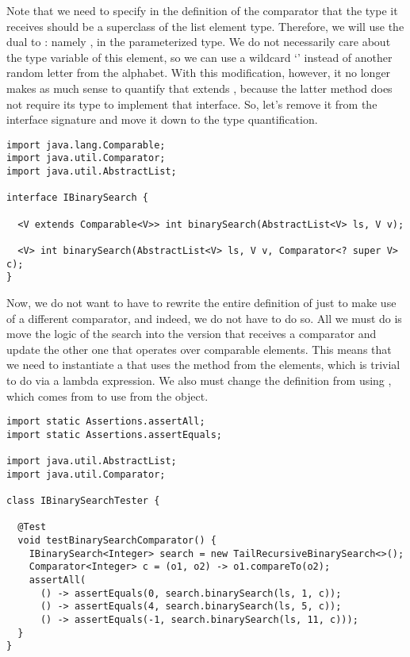 Note that we need to specify in the definition of the comparator that the type it receives should be a superclass of the list element type. 
Therefore, we will use the dual to : namely , in the parameterized type.
We do not necessarily care about the type variable of this element, so we can use a wildcard `' instead of another random letter from the alphabet. 
With this modification, however, it no longer makes as much sense to quantify that  extends , because the latter method does not require its type to implement that interface. 
So, let's remove it from the interface signature and move it down to the type quantification.

\begin{lstlisting}[language=MyJava]
import java.lang.Comparable;
import java.util.Comparator;
import java.util.AbstractList;

interface IBinarySearch {

  <V extends Comparable<V>> int binarySearch(AbstractList<V> ls, V v);

  <V> int binarySearch(AbstractList<V> ls, V v, Comparator<? super V> c);
}
\end{lstlisting}

Now, we do not want to have to rewrite the entire definition of  just to make use of a different comparator, and indeed, we do not have to do so. 
All we must do is move the logic of the search into the version that receives a comparator and update the other one that operates over comparable elements. 
This means that we need to instantiate a  that uses the  method from the elements, which is trivial to do via a lambda expression. 
We also must change the definition from using , which comes from  to use  from the  object.

\enlargethispage{3\baselineskip}
\begin{lstlisting}[language=MyJava]
import static Assertions.assertAll;
import static Assertions.assertEquals;

import java.util.AbstractList;
import java.util.Comparator;

class IBinarySearchTester {

  @Test
  void testBinarySearchComparator() {
    IBinarySearch<Integer> search = new TailRecursiveBinarySearch<>();
    Comparator<Integer> c = (o1, o2) -> o1.compareTo(o2);
    assertAll(
      () -> assertEquals(0, search.binarySearch(ls, 1, c));
      () -> assertEquals(4, search.binarySearch(ls, 5, c));
      () -> assertEquals(-1, search.binarySearch(ls, 11, c)));
  }
}
\end{lstlisting}

